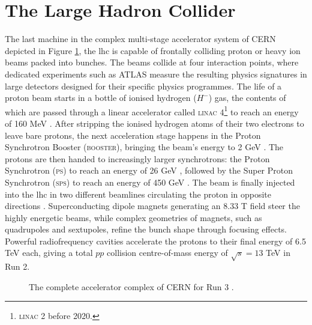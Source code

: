 \section{The Large Hadron Collider}\label{sec-LHC}
The last machine in the complex multi-stage accelerator system of CERN depicted in Figure \ref{fig-CernAccSys}, the \gls{lhc} is capable of frontally colliding proton or heavy ion beams packed into bunches. The beams collide at four interaction points, where dedicated experiments such as ATLAS measure the resulting physics signatures in large detectors designed for their specific physics programmes. The life of a proton beam starts in a bottle of ionised hydrogen ($H^-$) gas, the contents of which are passed through a linear accelerator called \textsc{linac} 4\footnote{\textsc{linac} 2 before 2020.} to reach an energy of 160 MeV \cite{Vretenar:2020quc}. After stripping the ionised hydrogen atoms of their two electrons to leave bare protons, the next acceleration stage happens in the Proton Synchrotron Booster (\textsc{booster}), bringing the beam's energy to 2 GeV \cite{Reich:1969fw}. The protons are then handed to increasingly larger synchrotrons: the Proton Synchrotron (\textsc{ps}) to reach an energy of 26 GeV \cite{CERNPS}, followed by the Super Proton Synchrotron (\textsc{sps}) to reach an energy of 450 GeV \cite{Synchrotron:1997188}. The beam is finally injected into the \gls{lhc} in two different beamlines circulating the proton in opposite directions \cite{Evans:2008zzb}. Superconducting dipole magnets generating an 8.33 T field steer the highly energetic beams, while complex geometries of magnets, such as quadrupoles and sextupoles, refine the bunch shape through focusing effects. Powerful radiofrequency cavities accelerate the protons to their final energy of 6.5 TeV each, giving a total $pp$ collision centre-of-mass energy of $\sqrt{s} = 13$ TeV in Run 2. 

\begin{figure}[!h]
  \centering
  \caption{The complete accelerator complex of CERN for Run 3 \cite{CERNAcc}.}
  \label{fig-CernAccSys}
\end{figure}

